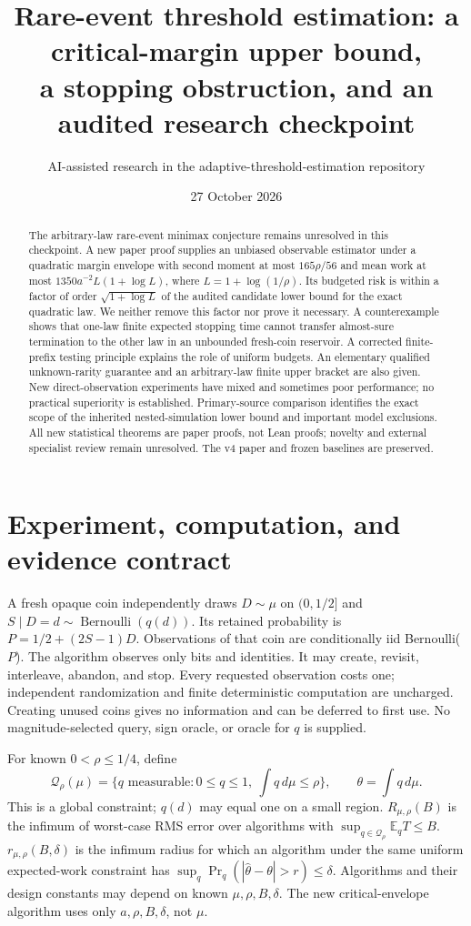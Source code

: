 \documentclass[11pt]{article}
\title{Rare-event threshold estimation: a critical-margin upper bound,\\a stopping obstruction, and an audited research checkpoint}
\author{AI-assisted research in the adaptive-threshold-estimation repository}
\date{27 October 2026}
\newcommand{\E}{\mathbb E}
\begin{document}
\maketitle
\begin{abstract}
The arbitrary-law rare-event minimax conjecture remains unresolved in this
checkpoint. A new paper proof supplies an unbiased observable estimator under
a quadratic margin envelope with second moment at most $165\rho/56$ and
mean work at most $1350a^{-2}L(1+\log L)$, where $L=1+\log(1/\rho)$.
Its budgeted risk is within a factor of order $\sqrt{1+\log L}$ of the
audited candidate lower bound for the exact quadratic law. We neither remove
this factor nor prove it necessary. A counterexample shows that one-law finite
expected stopping time cannot transfer almost-sure termination to the other
law in an unbounded fresh-coin reservoir. A corrected finite-prefix testing
principle explains the role of uniform budgets. An elementary qualified
unknown-rarity guarantee and an arbitrary-law finite upper bracket are also
given. New direct-observation experiments have mixed and sometimes poor
performance; no practical superiority is established. Primary-source
comparison identifies the exact scope of the inherited nested-simulation
lower bound and important model exclusions. All new statistical theorems are
paper proofs, not Lean proofs; novelty and external specialist review remain
unresolved. The v4 paper and frozen baselines are preserved.
\end{abstract}

\section{Experiment, computation, and evidence contract}
A fresh opaque coin independently draws $D\sim\mu$ on $(0,1/2]$ and
$S\mid D=d\sim\operatorname{Bernoulli}(q(d))$. Its retained probability is
$P=1/2+(2S-1)D$. Observations of that coin are conditionally iid Bernoulli($P$).
The algorithm observes only bits and identities. It may create, revisit,
interleave, abandon, and stop. Every requested observation costs one;
independent randomization and finite deterministic computation are uncharged.
Creating unused coins gives no information and can be deferred to first use.
No magnitude-selected query, sign oracle, or oracle for $q$ is supplied.

For known $0<\rho\le1/4$, define
\[
 \mathcal Q_\rho(\mu)=\{q\text{ measurable}:0\le q\le1,
                 \ \int q\,d\mu\le\rho\},\qquad \theta=\int q\,d\mu.
\]
This is a global constraint; $q(d)$ may equal one on a small region.
$R_{\mu,\rho}(B)$ is the infimum of worst-case RMS error over algorithms with
$\sup_{q\in\mathcal Q_\rho}\E_qT\le B$.
$r_{\mu,\rho}(B,\delta)$ is the infimum radius for which an algorithm under
the same uniform expected-work constraint has
$\sup_q\Pr_q(|\widehat\theta-\theta|>r)\le\delta$.
Algorithms and their design constants may depend on known $\mu,\rho,B,\delta$.
The new critical-envelope algorithm uses only $a,\rho,B,\delta$, not $\mu$.
\end{document}
